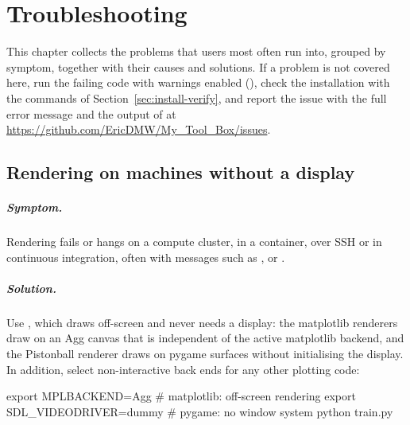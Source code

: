 \chapter{Troubleshooting}\label{chap:troubleshooting}
\begingroup\setlength{\emergencystretch}{3em}%

This chapter collects the problems that users most often run into, grouped by
symptom, together with their causes and solutions. If a problem is not
covered here, run the failing code with warnings enabled
(), check the installation with the commands of
Section~\ref{sec:install-verify}, and report the issue with the full error
message and the output of  at
\url{https://github.com/EricDMW/My_Tool_Box/issues}.

\section{Rendering on machines without a display}\label{sec:trouble-headless}

\paragraph{Symptom.} Rendering fails or hangs on a compute cluster, in a
container, over SSH or in continuous integration, often with messages such as
,  or
.

\paragraph{Solution.} Use , which draws
off-screen and never needs a display: the matplotlib renderers draw on an Agg
canvas that is independent of the active matplotlib backend, and the
Pistonball renderer draws on pygame surfaces without initialising the display.
In addition, select non-interactive back ends for any other plotting code:

\begin{shellcode}
export MPLBACKEND=Agg            # matplotlib: off-screen rendering
export SDL_VIDEODRIVER=dummy     # pygame: no window system
python train.py
\end{shellcode}

